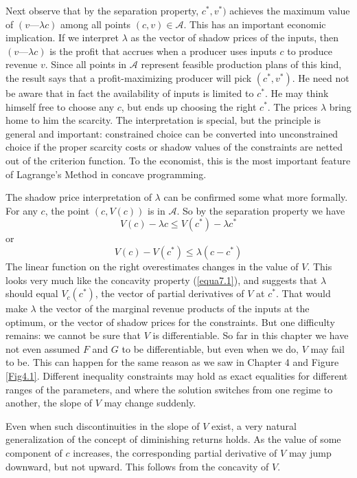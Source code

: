 Next observe that by the separation property, $c^*, v^*)$ achieves the maximum value of $(v — \lambda c)$ among all points $(c,v) \in \mathcal{A}$. This has an important economic implication. If we interpret $\lambda$ as the vector of shadow prices of the inputs, then $(v — \lambda c)$ is the profit that accrues when a producer uses inputs $c$ to produce revenue $v$. Since all points in $\mathcal{A}$ represent feasible production plans of this kind, the result says that a profit-maximizing producer will pick $(c^*, v^*)$. He need not be aware that in fact the availability of inputs is limited to $c^*$. He may think himself free to choose any $c$, but ends up choosing the right $c^*$. The prices $\lambda$ bring home to him the scarcity. The interpretation is special, but the principle is general and important: constrained choice can be converted into unconstrained choice if the proper scarcity costs or shadow values of the constraints are netted out of the criterion function. To the economist, this is the most important feature of Lagrange's Method in concave programming.

The shadow price interpretation of $\lambda$ can be confirmed some what more formally. For any $c$, the point $(c, V(c))$ is in $\mathcal{A}$. So by the separation property we have
\begin{equation*}
V(c) - \lambda c \leq V(c^*) - \lambda c^*
\end{equation*}
or
\begin{equation} \label{equa7.4}
V(c) - V(c^*) \leq \lambda (c-c^*)
\end{equation}
The linear function on the right overestimates changes in the value of $V$. This looks very much like the concavity property (\ref{equa7.1}), and suggests that $\lambda$ should equal $V_c(c^*)$, the vector of partial derivatives of $V$ at $c^*$. That would make $\lambda$ the vector of the marginal revenue products of the inputs at the optimum, or the vector of shadow prices for the constraints. But one difficulty remains: we cannot be sure that $V$ is differentiable. So far in this chapter we have not even assumed $F$ and $G$ to be differentiable, but even when we do, $V$ may fail to be. This can happen for the same reason as we saw in Chapter 4 and Figure \ref{Fig4.1}. Different inequality constraints may hold as exact equalities for different ranges of the parameters, and where the solution switches from one regime to another, the slope of $V$ may change suddenly.

Even when such discontinuities in the slope of $V$ exist, a very natural generalization of the concept of diminishing returns holds. As the value of some component of $c$ increases, the corresponding partial derivative of $V$ may jump downward, but not upward. This follows from the concavity of $V$.

